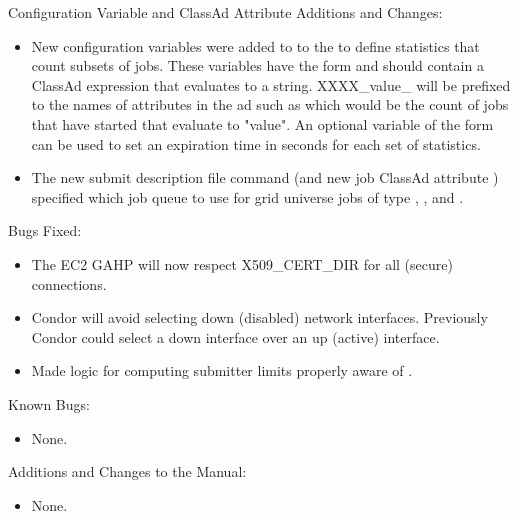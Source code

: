 \noindent Configuration Variable and ClassAd Attribute Additions and Changes:

\begin{itemize}

\item New configuration variables were added to to the  to
define statistics that count subsets of jobs. These variables
have the form  and should contain
a ClassAd expression that evaluates to a string.
XXXX\_value\_ will be prefixed to the names of attributes in the  ad
such as  which would be the count of jobs that have
started that evaluate to "value".  An optional variable of the form
 can be used to set an expiration time in seconds
for each set of statistics.

\item The new  submit description file command
(and new job ClassAd attribute ) specified which job
queue to use for grid universe jobs of type
, , and .

\end{itemize}

\noindent Bugs Fixed:

\begin{itemize}

\item The EC2 GAHP will now respect X509\_CERT\_DIR for all (secure) connections.

\item Condor will avoid selecting down (disabled) network interfaces.  Previously Condor could select a down interface over an up (active) interface.

\item Made  logic for computing submitter limits properly aware of .

\end{itemize}

\noindent Known Bugs:

\begin{itemize}

\item None.

\end{itemize}

\noindent Additions and Changes to the Manual:

\begin{itemize}

\item None.

\end{itemize}


